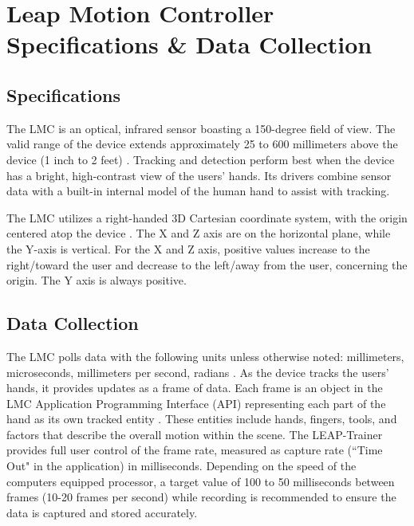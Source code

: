 \documentclass[letterpaper, 10 pt, conference]{ieeeconf}
\begin{document}

\section{Leap Motion Controller Specifications \& Data Collection}

\subsection{Specifications}
The LMC is an optical, infrared sensor boasting a 150-degree field of view. The valid range of the device extends approximately 25 to 600 millimeters above the device (1 inch to 2 feet) \cite{LMC}. Tracking and detection perform best when the device has a bright, high-contrast view of the users’ hands. Its drivers combine sensor data with a built-in internal model of the human hand to assist with tracking.
\vspace{5pt}

The LMC utilizes a right-handed 3D Cartesian coordinate system, with the origin centered atop the device \cite{LMC}. The X and Z axis are on the horizontal plane, while the Y-axis is vertical. For the X and Z axis, positive values increase to the right/toward the user and decrease to the left/away from the user, concerning the origin. The Y axis is always positive.

\subsection{Data Collection}

The LMC polls data with the following units unless otherwise noted: millimeters, microseconds, millimeters per second, radians \cite{LMC}. As the device tracks the users' hands, it provides updates as a frame of data. Each frame is an object in the LMC Application Programming Interface (API) representing each part of the hand as its own tracked entity \cite{LEAPAPI}. These entities include hands, fingers, tools, and factors that describe the overall motion within the scene. The LEAP-Trainer provides full user control of the frame rate, measured as capture rate (``Time Out" in the application) in milliseconds. Depending on the speed of the computers equipped processor, a target value of 100 to 50 milliseconds between frames (10-20 frames per second) while recording is recommended to ensure the data is captured and stored accurately.
\end{document}
